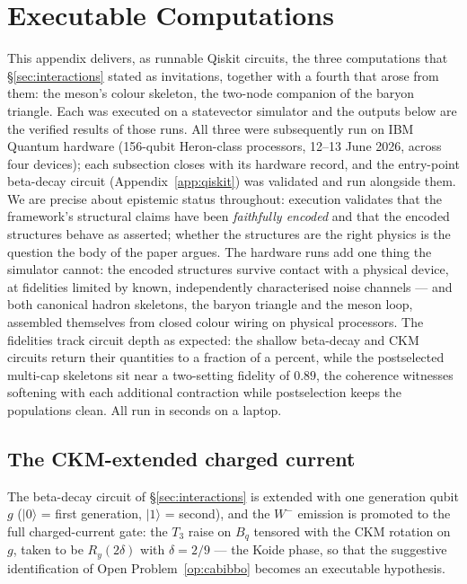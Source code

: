 \section{Executable Computations}
\label{app:qiskit-handles}

This appendix delivers, as runnable Qiskit circuits, the three computations that
\S\ref{sec:interactions} stated as invitations, together with a fourth that arose from them: the
meson's colour skeleton, the two-node companion of the baryon triangle. Each was executed on a statevector simulator and the
outputs below are the verified results of those runs. All three were subsequently run on IBM Quantum
hardware (156-qubit Heron-class processors, 12--13 June 2026, across four devices); each subsection
closes with its hardware record, and the entry-point beta-decay circuit
(Appendix~\ref{app:qiskit}) was validated and run alongside them. We are precise about epistemic status
throughout: execution validates that the framework's structural claims have been \emph{faithfully
encoded} and that the encoded structures behave as asserted; whether the structures are the right
physics is the question the body of the paper argues. The hardware runs add one thing the simulator
cannot: the encoded structures survive contact with a physical device, at fidelities limited by
known, independently characterised noise channels --- and both canonical hadron skeletons, the
baryon triangle and the meson loop, assembled themselves from closed colour wiring on physical
processors. The fidelities track circuit depth as expected: the shallow beta-decay and CKM circuits
return their quantities to a fraction of a percent, while the postselected multi-cap skeletons sit
near a two-setting fidelity of $0.89$, the coherence witnesses softening with each additional
contraction while postselection keeps the populations clean. All run in seconds on a laptop.

\subsection{The CKM-extended charged current}
\label{app:qiskit-ckm}

The beta-decay circuit of \S\ref{sec:interactions} is extended with one generation qubit $g$
($\lvert0\rangle$ = first generation, $\lvert1\rangle$ = second), and the $W^-$ emission is promoted
to the full charged-current gate: the $T_3$ raise on $B_q$ tensored with the CKM rotation on $g$,
taken to be $R_y(2\delta)$ with $\delta = 2/9$ --- the Koide phase, so that the suggestive
identification of Open Problem~\ref{op:cabibbo} becomes an executable hypothesis.

